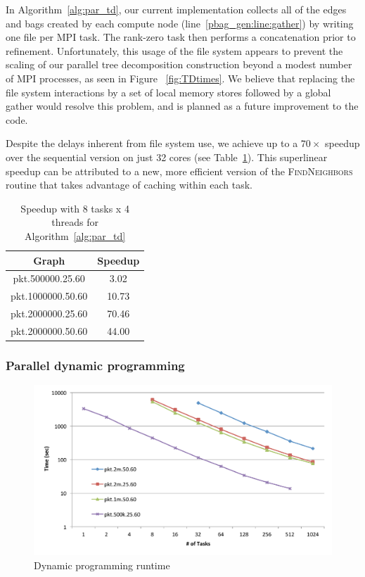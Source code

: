 \documentclass[conference]{IEEEtran}
\begin{document}
In Algorithm~\ref{alg:par_td}, our current implementation collects all of the
edges and bags created by each compute node (line~\ref{pbag_gen:line:gather})
by writing one file per MPI task.  The rank-zero task then performs a concatenation
prior to refinement. Unfortunately, this usage of the file system appears to prevent the scaling of our
parallel tree decomposition construction beyond a modest number of MPI processes, as seen in Figure ~\ref{fig:TDtimes}.
We believe that replacing the file system interactions by a set of local memory stores followed by a global gather would resolve this problem, and is planned as a future improvement to the code.

Despite the delays inherent from file system use, we achieve up to a $70\times$
speedup over the sequential version on just 32 cores (see Table~\ref{tbl:td_scale}).
This superlinear speedup can be attributed to a new, more efficient version of the \textsc{FindNeighbors} routine
that takes advantage of caching within each task.

\begin{table}
\centering
\begin{tabular}{|c|c|}
\hline
Graph & Speedup \\
\hline
pkt.500000.25.60 & 3.02\\
pkt.1000000.50.60 & 10.73\\
pkt.2000000.25.60 & 70.46\\
pkt.2000000.50.60 & 44.00\\
\hline
\end{tabular}
\caption{Speedup with 8 tasks x 4 threads for Algorithm~\ref{alg:par_td}}
\label{tbl:td_scale}
\end{table}

\subsubsection{Parallel dynamic programming}\label{sec:exp_dp}

\begin{figure}[!t]
\includegraphics[angle=0,width=6in]{figures/newfig9_col.pdf}
\caption{Dynamic programming runtime}
\label{fig:DPtimes}
\end{figure}
\end{document}
